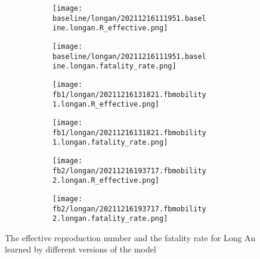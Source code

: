 \begin{figure}[!htb]
    \centering

    \begin{subfigure}[b]{\linewidth}
        \centering
        \begin{subfigure}[b]{0.4\linewidth}
            \texttt{[image: baseline/longan/20211216111951.baseline.longan.R\_effective.png]}
        \end{subfigure}
        \begin{subfigure}[b]{0.4\linewidth}
            \texttt{[image: baseline/longan/20211216111951.baseline.longan.fatality\_rate.png]}
        \end{subfigure}
    \end{subfigure}

    \begin{subfigure}[b]{\linewidth}
        \centering
        \begin{subfigure}[b]{0.4\linewidth}
            \texttt{[image: fb1/longan/20211216131821.fbmobility1.longan.R\_effective.png]}
        \end{subfigure}
        \begin{subfigure}[b]{0.4\linewidth}
            \texttt{[image: fb1/longan/20211216131821.fbmobility1.longan.fatality\_rate.png]}
        \end{subfigure}
    \end{subfigure}

    \begin{subfigure}[b]{\linewidth}
        \centering
        \begin{subfigure}[b]{0.4\linewidth}
            \texttt{[image: fb2/longan/20211216193717.fbmobility2.longan.R\_effective.png]}
        \end{subfigure}
        \begin{subfigure}[b]{0.4\linewidth}
            \texttt{[image: fb2/longan/20211216193717.fbmobility2.longan.fatality\_rate.png]}
        \end{subfigure}
    \end{subfigure}

    \caption{The effective reproduction number and the fatality rate for Long An learned by different versions of the model}
    \label{fig:R0-and-fatality-longan}
\end{figure}
